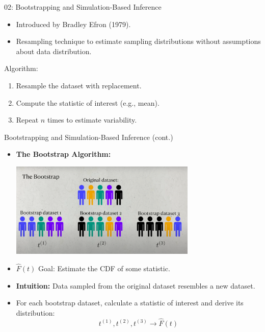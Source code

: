 \documentclass{beamer}
\begin{document}
\begin{frame}{02: Bootstrapping and Simulation-Based Inference}
\begin{itemize}
    \item Introduced by Bradley Efron (1979).
    \item Resampling technique to estimate sampling distributions without assumptions about data distribution.
\end{itemize}

\begin{exampleblock}{Algorithm:}
\begin{enumerate}
    \item Resample the dataset with replacement.
    \item Compute the statistic of interest (e.g., mean).
    \item Repeat \( n \) times to estimate variability.
\end{enumerate}
\end{exampleblock}
\end{frame}

\begin{frame}{Bootstrapping and Simulation-Based Inference (cont.)}
\begin{itemize}
    \item \textbf{The Bootstrap Algorithm:}
    \begin{center}
        \includegraphics[width=0.7\textwidth]{bootstrap_populations.png}
    \end{center}
    \item \( \hat{F}(t) \) Goal: Estimate the CDF of some statistic.
    \item \textbf{Intuition:} Data sampled from the original dataset resembles a new dataset.
    \item For each bootstrap dataset, calculate a statistic of interest and derive its distribution:
    \[
    t^{(1)}, t^{(2)}, t^{(3)} \to \hat{F}(t)
    \]
\end{itemize}
\end{frame}
\end{document}
